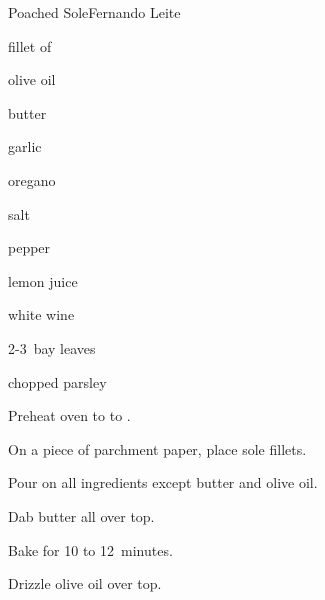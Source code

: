 \begin{recipe}{Poached Sole}{Fernando Leite}{}

\begin{ingredients}
\item fillet of 
\item olive oil
\item butter
\item garlic
\item oregano
\item salt
\item pepper
\item lemon juice
\item white wine
\item 2-3~bay leaves
\item chopped parsley
\end{ingredients}

\begin{directions}
\item Preheat oven to  to .
\item On a piece of parchment paper, place sole fillets.
\item Pour on all ingredients except butter and olive oil.
\item Dab butter all over top.
\item Bake for 10 to 12~minutes.
\item Drizzle olive oil over top.
\end{directions}

\end{recipe}
